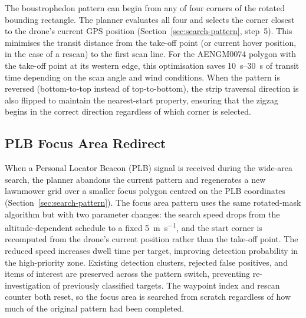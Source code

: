 The boustrophedon pattern can begin from any of four corners of the rotated bounding rectangle.  The planner evaluates all four and selects the corner closest to the drone's current GPS position (Section~\ref{sec:search-pattern}, step~5).  This minimises the transit distance from the take-off point (or current hover position, in the case of a rescan) to the first scan line.  For the AENGM0074 polygon with the take-off point at its western edge, this optimisation saves \SIrange{10}{30}{\second} of transit time depending on the scan angle and wind conditions.  When the pattern is reversed (bottom-to-top instead of top-to-bottom), the strip traversal direction is also flipped to maintain the nearest-start property, ensuring that the zigzag begins in the correct direction regardless of which corner is selected.

\subsection{PLB Focus Area Redirect}\label{sec:plb-redirect}

When a Personal Locator Beacon (PLB) signal is received during the wide-area search, the planner abandons the current pattern and regenerates a new lawnmower grid over a smaller focus polygon centred on the PLB coordinates (Section~\ref{sec:search-pattern}).  The focus area pattern uses the same rotated-mask algorithm but with two parameter changes: the search speed drops from the altitude-dependent schedule to a fixed \SI{5}{\metre\per\second}, and the start corner is recomputed from the drone's current position rather than the take-off point.  The reduced speed increases dwell time per target, improving detection probability in the high-priority zone.  Existing detection clusters, rejected false positives, and items of interest are preserved across the pattern switch, preventing re-investigation of previously classified targets.  The waypoint index and rescan counter both reset, so the focus area is searched from scratch regardless of how much of the original pattern had been completed.
